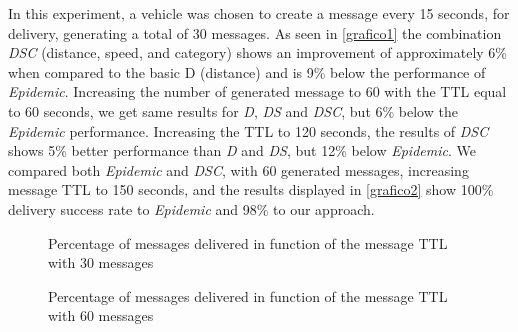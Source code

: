 \documentclass[letterpaper, 10 pt, conference]{ieeeconf}  %
\begin{document}
In this experiment, a vehicle was chosen to create a message every 15 seconds, for delivery, generating a total of 30 messages. 
As seen in \autoref{grafico1} the combination \emph{DSC} (distance, speed, and category) shows an improvement of approximately 6\% when compared to the basic D (distance) and is 9\% below the performance of \emph{Epidemic}. Increasing the number of generated message to 60 with the TTL equal to 60 seconds, we get same results for \emph{D}, \emph{DS} and \emph{DSC}, but 6\% below the \emph{Epidemic} performance. Increasing the TTL to 120 seconds, the results of \emph{DSC} shows 5\% better performance than \emph{D} and \emph{DS}, but 12\% below \emph{Epidemic}. We compared both \emph{Epidemic} and \emph{DSC}, with 60 generated messages, increasing message TTL to 150 seconds, and the results displayed in \autoref{grafico2} show 100\% delivery success rate to \emph{Epidemic} and 98\% to our approach.

\begin{figure}[thpb]
    \center
    \caption{Percentage of messages delivered in function of the message TTL with 30 messages} \label{grafico1}
\end{figure}

\begin{figure}[thpb]
    \center
    \caption{Percentage of messages delivered in function of the message TTL with 60 messages} \label{grafico2}
\end{figure}
\end{document}

